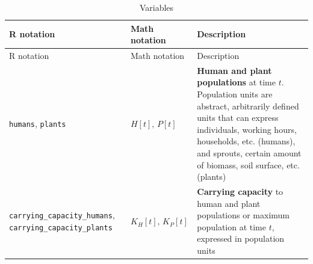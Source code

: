 \documentclass[
]{book}
\begin{document}
\begin{longtable}[]{@{}lll@{}}
\caption{Variables}\tabularnewline
\toprule
\begin{minipage}[b]{0.36\columnwidth}\raggedright
R notation\strut
\end{minipage} & \begin{minipage}[b]{0.21\columnwidth}\raggedright
Math notation\strut
\end{minipage} & \begin{minipage}[b]{0.34\columnwidth}\raggedright
Description\strut
\end{minipage}\tabularnewline
\midrule
\endfirsthead
\toprule
\begin{minipage}[b]{0.36\columnwidth}\raggedright
R notation\strut
\end{minipage} & \begin{minipage}[b]{0.21\columnwidth}\raggedright
Math notation\strut
\end{minipage} & \begin{minipage}[b]{0.34\columnwidth}\raggedright
Description\strut
\end{minipage}\tabularnewline
\midrule
\endhead
\begin{minipage}[t]{0.36\columnwidth}\raggedright
\texttt{humans}, \texttt{plants}\strut
\end{minipage} & \begin{minipage}[t]{0.21\columnwidth}\raggedright
\(H[t],\,P[t]\)\strut
\end{minipage} & \begin{minipage}[t]{0.34\columnwidth}\raggedright
\textbf{Human and plant populations} at time \(t\). Population units are abstract, arbitrarily defined units that can express individuals, working hours, households, etc. (humans), and sprouts, certain amount of biomass, soil surface, etc. (plants)\strut
\end{minipage}\tabularnewline
\begin{minipage}[t]{0.36\columnwidth}\raggedright
\texttt{carrying\_capacity\_humans}, \texttt{carrying\_capacity\_plants}\strut
\end{minipage} & \begin{minipage}[t]{0.21\columnwidth}\raggedright
\(K_{H}[t],\,K_{P}[t]\)\strut
\end{minipage} & \begin{minipage}[t]{0.34\columnwidth}\raggedright
\textbf{Carrying capacity} to human and plant populations or maximum population at time \(t\), expressed in population units\strut
\end{minipage}\tabularnewline

\end{longtable}
\end{document}
